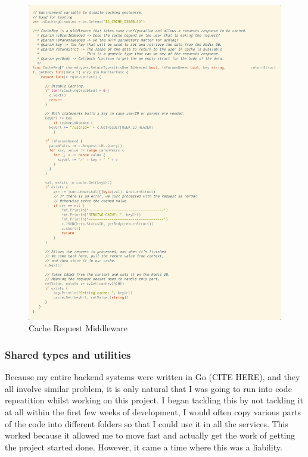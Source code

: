 \documentclass[titlepage]{article}
\begin{document}
\begin{figure}
  \caption{Cache Request Middleware}
  \label{cachereq}
  \hspace*{-3cm}
  \includegraphics[width=1.5\textwidth]{../Diagrams/cachereq.png}
\end{figure}

\pagebreak
\subsubsection{Shared types and utilities}
Because my entire backend systems were written in Go (CITE HERE), and they all involve similar problem, it is only natural that I was going to run into code repeatition whilst working on this project. I began tackling this by not tackling it at all within the first few weeks of development, I would often copy various parts of the code into different folders so that I could use it in all the services. This worked because it allowed me to move fast and actually get the work of getting the project started done. However, it came a time where this was a liability. \\
\end{document}
